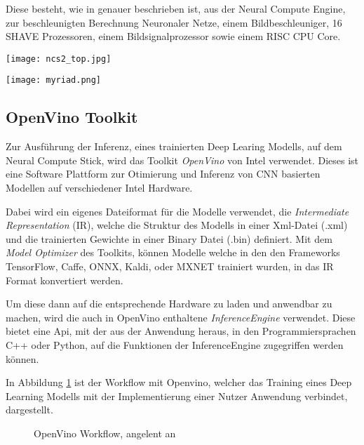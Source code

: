 Diese besteht, wie in
\cite{haussermannFunktionUndEffizienz} genauer 
beschrieben ist, aus der Neural Compute Engine, 
zur beschleunigten Berechnung Neuronaler Netze,
einem Bildbeschleuniger, 16 SHAVE Prozessoren, einem 
Bildsignalprozessor sowie einem RISC CPU Core.

\vspace{1cm}
\begin{minipage}{0.4\textwidth}
    \centering
    \texttt{[image: ncs2\_top.jpg]}
    \label{fig:ncs2}
\end{minipage}
\begin{minipage}{0.6\textwidth}
    \centering
    \texttt{[image: myriad.png]}
    \label{fig:myriad}
\end{minipage}


\subsection{OpenVino Toolkit}

Zur Ausführung der Inferenz, eines trainierten Deep Learing
Modells, auf dem Neural Compute Stick, wird das Toolkit 
\textit{OpenVino} von Intel verwendet.
Dieses ist eine Software Plattform zur Otimierung und Inferenz 
von CNN basierten Modellen auf verschiedener Intel Hardware.

Dabei wird ein eigenes Dateiformat für die Modelle verwendet, 
die \textit{Intermediate Representation} (IR),
welche die Struktur des Modells 
in einer Xml-Datei (.xml) und die trainierten Gewichte in 
einer Binary Datei (.bin) definiert.
Mit dem \textit{Model Optimizer} des Toolkits,
können Modelle welche in den den Frameworks TensorFlow,
Caffe, ONNX, Kaldi, oder MXNET trainiert wurden, 
in das IR Format konvertiert werden.

Um diese dann auf die entsprechende Hardware zu laden und anwendbar 
zu machen, wird die auch in OpenVino enthaltene
\textit{InferenceEngine} verwendet.
Diese bietet eine Api, mit der aus der Anwendung heraus, in den
Programmiersprachen C++ oder Python, auf die Funktionen der 
InferenceEngine zugegriffen werden können.


In Abbildung \ref{fig:openvinoflow} ist der Workflow mit 
Openvino, welcher das Training eines Deep Learning Modells 
mit der Implementierung einer Nutzer Anwendung verbindet, 
dargestellt.


\vspace{1cm}
\begin{figure}[H]
    \centering
    \def\svgwidth{0.8\textwidth}
    
    \caption{OpenVino Workflow, angelent an 
    \cite{openvinoflow}}
    \label{fig:openvinoflow}
\end{figure}
